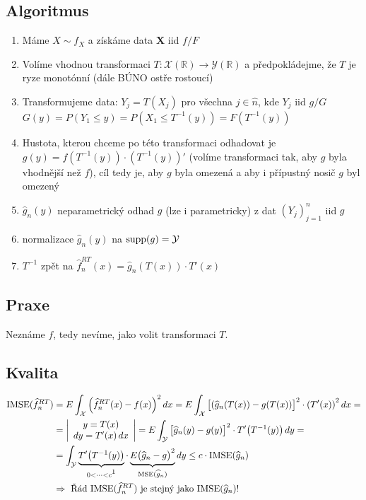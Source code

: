 \documentclass{article}
\theoremstyle{remark}
\theoremstyle{plain}
\theoremstyle{definition}
\theoremstyle{remark}
\begin{document}
\subsection{Algoritmus}
\begin{enumerate}
    \item Máme $X\sim f_X$ a získáme data $\textbf{X}$ iid $f/F$
    \item Volíme vhodnou transformaci $T:\mathcal{X}(\mathbb{R})\to\mathcal{Y}(\mathbb{R})$ a předpokládejme, že $T$ je ryze monotónní (dále BÚNO ostře rostoucí)
    \item Transformujeme data: $Y_j=T(X_j)$ pro všechna $j\in\widehat{n}$, kde $Y_j$ iid $g/G$\newline
    $G(y)=P(Y_1\leq y)=P(X_1\leq T^{-1}(y))=F(T^{-1}(y))$
    \item Hustota, kterou chceme po této transformaci odhadovat je $g(y)=f(T^{-1}(y))\cdot\left(T^{-1}(y)\right)'$ (volíme transformaci tak, aby $g$ byla vhodnější než $f$), cíl tedy je, aby $g$ byla omezená a aby i přípustný nosič $g$ byl omezený
    \item $\widehat{g}_n(y)$ neparametrický odhad $g$ (lze i parametricky) z dat $(Y_j)_{j=1}^n$ iid $g$
    \item normalizace $\widehat{g}_n(y)$ na $\textnormal{supp}(g)=\mathcal{Y}$
    \item $T^{-1}$ zpět na $\widehat{f}_n^{RT}(x)=\widehat{g}_n(T(x))\cdot T'(x)$
\end{enumerate}
\vspace{0.2cm}

\subsection{Praxe} Neznáme $f$, tedy nevíme, jako volit transformaci $T$.
\vspace{0.35cm}

\subsection{Kvalita} 
\begin{align*}
    \textnormal{IMSE}(\widehat{f}_n^{RT})&=E\int_\mathcal{X}\left(\widehat{f}_n^{RT}(x)-f(x)\right)^2dx=E\int_\mathcal{X}\big[(\widehat{g}_n(T(x))-g(T(x))\big]^2\cdot \left(T'(x)\right)^2dx= \\
    &=\bigg|\begin{array}{c}
         y=T(x)\\
         dy=T'(x)\,dx 
    \end{array}\bigg|=E\int_\mathcal{Y}\big[\widehat{g}_n(y)-g(y)\big]^2\cdot T'\big(T^{-1}(y)\big)\,dy= \\
    &=\int_\mathcal{Y}\underbrace{T'\big(T^{-1}(y)\big)}_{0<\dots<c\footnotemark{}}\cdot \underbrace{E\big(\widehat{g}_n-g\big)^2}_{\textnormal{MSE}(\widehat{g}_n)}dy\leq c\cdot \textnormal{IMSE}(\widehat{g}_n) \\
    &\Rightarrow \textnormal{ Řád IMSE}(\widehat{f}_n^{RT}) \textnormal{ je stejný jako IMSE}(\widehat{g}_n)!
\end{align*}
\end{document}
